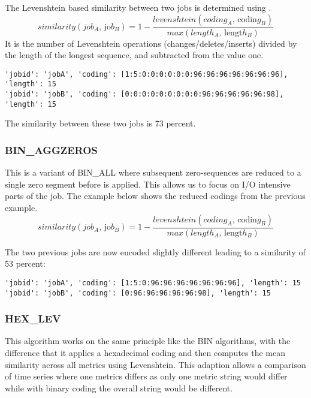 \documentclass{jhps}
\begin{document}
The Levenshtein based similarity between two jobs is determined using .
\begin{equation}
similarity \left( job_{A}\text{, jo}b_{B} \right) =1- \frac{levenshtein \left( coding_{A}\text{, codin}g_{B} \right) }{max \left( length_{A}\text{, lengt}h_{B} \right) } \label{eq:lev}
\end{equation}
It is the number of Levenshtein operations (changes/deletes/inserts) divided by the length of the longest sequence, and subtracted from the value one.

\begin{lstlisting}
'jobid': 'jobA', 'coding': [1:5:0:0:0:0:0:0:96:96:96:96:96:96:96], 'length': 15
'jobid': 'jobB', 'coding': [0:0:0:0:0:0:0:0:0:96:96:96:96:96:98], 'length': 15
\end{lstlisting}

The similarity between these two jobs is 73 percent.

\subsubsection{BIN\_AGGZEROS}
This is a variant of BIN\_ALL where subsequent zero-sequences are reduced to a single zero segment before  is applied.
This allows us to focus on I/O intensive parts of the job.
The example below shows the reduced codings from the previous example.
\begin{equation}
similarity \left( job_{A}\text{, jo}b_{B} \right) =1- \frac{levenshtein \left( coding_{A}\text{, codin}g_{B} \right) }{max \left( length_{A}\text{, lengt}h_{B} \right) }
\end{equation}

The two previous jobs are now encoded slightly different leading to a similarity of 53 percent:
\begin{lstlisting}
'jobid': 'jobA', 'coding': [1:5:0:96:96:96:96:96:96:96], 'length': 15
'jobid': 'jobB', 'coding': [0:96:96:96:96:96:98], 'length': 15
\end{lstlisting}

\subsubsection{HEX\_LEV}
This algorithm works on the same principle like the BIN algorithms, with the difference that it applies a hexadecimal coding and then computes the mean similarity across all metrics using Levenshtein.
This adaption allows a comparison of time series where one metrics differs as only one metric string would differ while with binary coding the overall string would be different.
\end{document}
